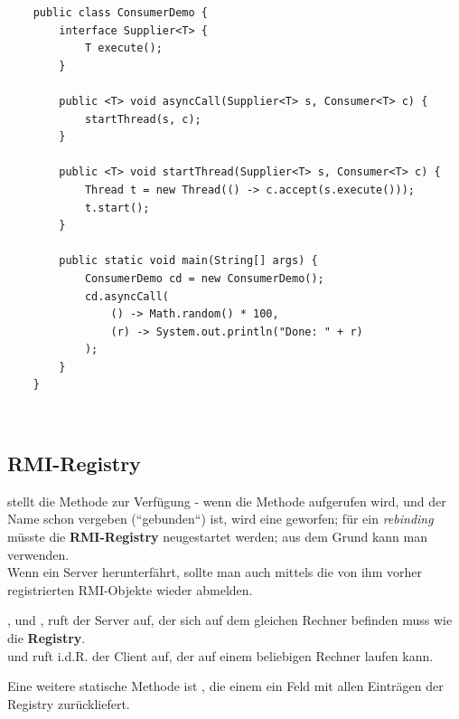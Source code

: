 \begin{verbatim}
    public class ConsumerDemo {
        interface Supplier<T> {
            T execute();
        }

        public <T> void asyncCall(Supplier<T> s, Consumer<T> c) {
            startThread(s, c);
        }

        public <T> void startThread(Supplier<T> s, Consumer<T> c) {
            Thread t = new Thread(() -> c.accept(s.execute()));
            t.start();
        }

        public static void main(String[] args) {
            ConsumerDemo cd = new ConsumerDemo();
            cd.asyncCall(
                () -> Math.random() * 100,
                (r) -> System.out.println("Done: " + r)
            );
        }
    }
\end{verbatim}\\

\subsection{RMI-Registry}

 stellt die Methode  zur Verfügung - wenn die Methode aufgerufen wird, und der Name schon vergeben (``gebunden``) ist, wird eine  geworfen; für ein \textit{rebinding} müsste die \textbf{RMI-Registry} neugestartet werden; aus dem Grund kann man  verwenden.\\
Wenn ein Server herunterfährt, sollte man auch mittels  die von ihm vorher registrierten RMI-Objekte wieder abmelden.

\begin{tcolorbox}[enlarge top by=0.5cm,enlarge bottom by=0.5cm]
    ,  und , ruft der Server auf, der sich auf dem gleichen Rechner befinden muss wie die \textbf{Registry}.\\
    \noindent
     und  ruft i.d.R. der Client auf, der auf einem beliebigen Rechner laufen kann.
\end{tcolorbox}

\noindent
Eine weitere statische Methode ist , die einem ein Feld mit allen Einträgen der Registry zurückliefert.\\

